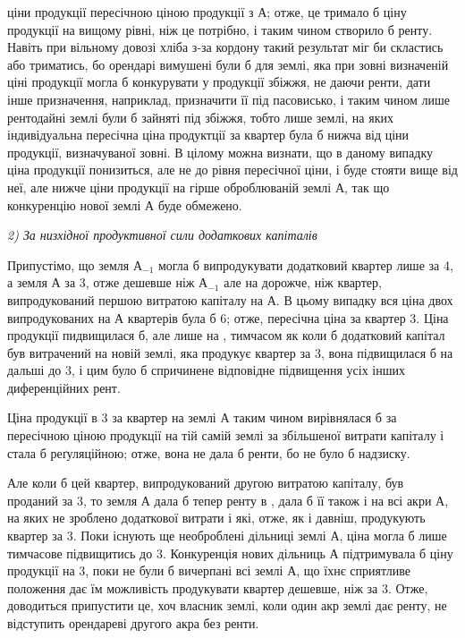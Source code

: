 \parcont{}  %
ціни продукції пересічною ціною продукції з $А$; отже, це тримало б ціну продукції
на вищому рівні, ніж це потрібно, і таким чином створило б ренту.
Навіть при вільному довозі хліба з-за кордону такий результат міг би скластись
або триматись, бо орендарі вимушені були б для землі, яка при зовні
визначеній ціні продукції могла б конкурувати у продукції збіжжя, не даючи
ренти, дати інше призначення, наприклад, призначити її під пасовисько, і таким
чином лише рентодайні землі були б зайняті під збіжжя, тобто лише землі,
на яких індивідуальна пересічна ціна продуктції за квартер була б нижча від
ціни продукції, визначуваної зовні. В цілому можна визнати, що в даному випадку
ціна продукції понизиться, але не до рівня пересічної ціни, і буде стояти
вище від неї, але нижче ціни продукції на гірше оброблюваній землі $А$, так
що конкуренцію нової землі $А$ буде обмежено.

\emph{2) За низхідної продуктивної сили додаткових капіталів}

Припустімо, що земля $А_{-1}$ могла б випродукувати додатковий квартер
лише за 4, а земля $А$ за 3, отже дешевше ніж $А_{-1}$ але на  дорожче, ніж квартер, випродукований першою витратою капіталу на
$А$. В цьому випадку вся ціна двох випродукованих на $А$ квартерів була б \deq{}
6; отже, пересічна ціна за квартер \deq{} 3. Ціна продукції
пидвищилася б, але лише на , тимчасом як коли б додатковий
капітал був витрачений на новій землі, яка продукує квартер за 3, вона підвищилася б на дальші  до 3, і цим
було б спричинене відповідне підвищення усіх інших диференційних рент.

Ціна продукції в 3 за квартер на землі $А$ таким чином
вирівнялася б за пересічною ціною продукції на тій самій землі за збільшеної
витрати капіталу і стала б реґуляційною; отже, вона не дала б ренти, бо не
було б надзиску.

Але коли б цей квартер, випродукований другою витратою капіталу, був проданий
за 3, то земля $А$ дала б тепер ренту в ,
дала б її також і на всі акри $А$, на яких не зроблено додаткової витрати і
які, отже, як і давніш, продукують квартер за 3. Поки існують ще
необроблені дільниці землі $А$, ціна могла б лише тимчасове підвищитись до
3. Конкуренція нових дільниць $А$ підтримувала б ціну продукції
на 3, поки не були б вичерпані всі землі $А$, що їхнє сприятливе положення
дає їм можливість продукувати квартер дешевше, ніж за 3.
Отже, доводиться припустити це, хоч власник землі, коли один акр землі дає ренту,
не відступить орендареві другого акра без ренти.

